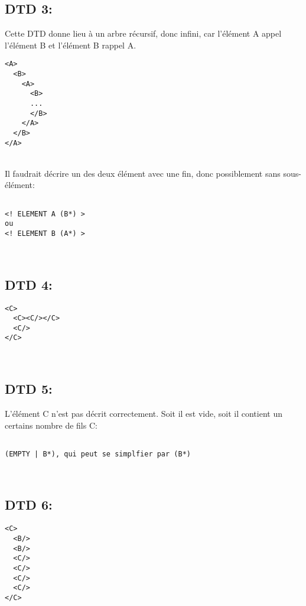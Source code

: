 \documentclass[10pt]{article}
\newenvironment{DDbox}[1]{
\begin{lrbox}{\BBbox}\begin{minipage}{\linewidth}}
{\end{minipage}\end{lrbox}\noindent\colorbox{white}{\usebox{\BBbox}} \\
[.5cm]}
\begin{document}
\subsection{DTD 3:}
Cette DTD donne lieu à un arbre récursif, donc infini, car l'élément A appel l'élément B et l'élément B rappel A.\\
\begin{DDbox}{\linewidth}
\begin{lstlisting}
<A>
  <B>
    <A>
      <B>
      ...
      </B>
    </A>
  </B>
</A>
\end{lstlisting}
\end{DDbox}
Il faudrait décrire un des deux élément avec une fin, donc possiblement sans sous-élément:\\
\begin{DDbox}{\linewidth}
\begin{lstlisting}

<! ELEMENT A (B*) >
ou
<! ELEMENT B (A*) >

\end{lstlisting}
\end{DDbox}

\subsection{DTD 4:}
\begin{DDbox}{\linewidth}
\begin{lstlisting}
<C>
  <C><C/></C>
  <C/>
</C>
\end{lstlisting}
\end{DDbox}

\subsection{DTD 5:}
L'élément C n'est pas décrit correctement. Soit il est vide, soit il contient un certains nombre de fils C:\\
\begin{DDbox}{\linewidth}
\begin{lstlisting}

(EMPTY | B*), qui peut se simplfier par (B*)
\end{lstlisting}
\end{DDbox}

\subsection{DTD 6:}
\begin{DDbox}{\linewidth}
\begin{lstlisting}
<C>
  <B/>
  <B/>
  <C/>
  <C/>
  <C/>
  <C/>
</C>
\end{lstlisting}
\end{DDbox}
\end{document}
